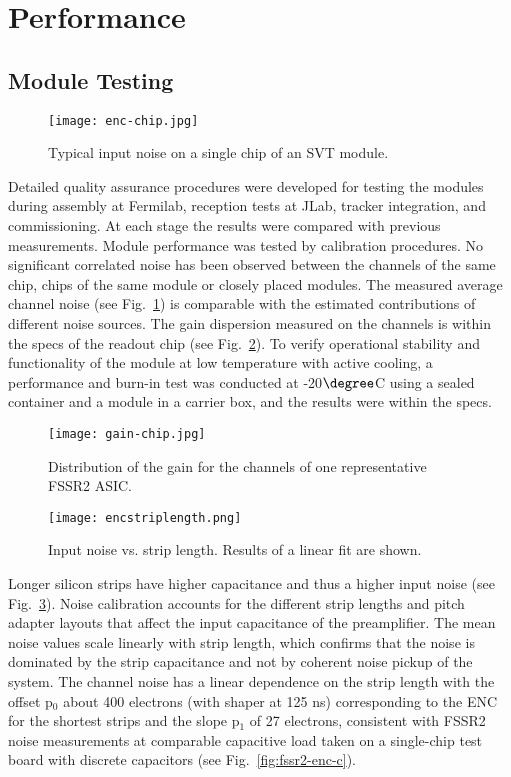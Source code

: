 \section{Performance}

\subsection{Module Testing}

\begin{figure}[hbt] 
\centering 
\texttt{[image: enc-chip.jpg]}
\caption{Typical input noise on a single chip of an SVT module.}
\label{fig:enc-chip}
\end{figure} 

Detailed quality assurance procedures were developed for testing the modules during assembly at Fermilab, reception tests at JLab, tracker integration, and commissioning. At each stage the results were compared with previous measurements. Module performance was tested by calibration procedures. No significant correlated noise has been observed between the channels of the same chip, chips of the same module or closely placed modules. The measured average channel noise (see Fig.~\ref{fig:enc-chip}) is comparable with the estimated contributions of different noise sources. The gain dispersion measured on the channels is within the specs of the readout chip (see Fig.~\ref{fig:gain-chip}). To verify operational stability and functionality of the module at low temperature with active cooling, a performance and burn-in test was conducted at -20$\degree$C using a sealed container and a module in a carrier box, and the results were within the specs.

\begin{figure}[hbt] 
\centering 
\texttt{[image: gain-chip.jpg]}
\caption{Distribution of the gain for the channels of one representative FSSR2 ASIC.}
\label{fig:gain-chip}
\end{figure}

\begin{figure}[hbt] 
	\centering 
	\texttt{[image: encstriplength.png]}
	\caption{Input noise vs. strip length. Results of a linear fit are shown.}
	\label{fig:encstriplength}
\end{figure}

Longer silicon strips have higher capacitance and thus a higher input noise (see Fig.~\ref{fig:encstriplength}). Noise calibration accounts for the different strip lengths and pitch adapter layouts that affect the input capacitance of the preamplifier. The mean noise values scale linearly with strip length, which confirms that the noise is dominated by the strip capacitance and not by coherent noise pickup of the system. The channel noise has a linear dependence on the strip length with the offset p$_{0}$ about 400 electrons (with shaper at 125 ns) corresponding to the ENC for the shortest strips and the slope p$_1$ of 27 electrons, consistent with FSSR2 noise measurements at comparable capacitive load taken on a single-chip test board with discrete capacitors (see Fig.~\ref{fig:fssr2-enc-c}).

